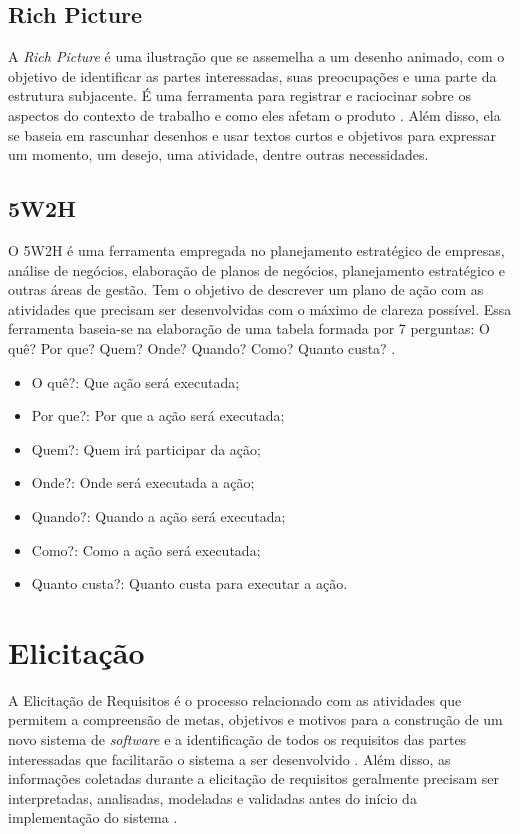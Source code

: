 \subsection{Rich Picture}
A \textit{Rich Picture} é uma ilustração que se assemelha a um desenho animado, com o objetivo de identificar as partes interessadas, suas preocupações e uma parte da estrutura subjacente. É uma ferramenta para registrar e raciocinar sobre os aspectos do contexto de trabalho e como eles afetam o produto  \cite{10.1145/274430.274434}. Além disso, ela se baseia em rascunhar desenhos e usar textos curtos e objetivos para expressar um momento, um desejo, uma atividade, dentre outras necessidades.

\subsection{5W2H}
O 5W2H é uma ferramenta empregada no planejamento estratégico de empresas, análise de negócios, elaboração de planos de negócios, planejamento estratégico e outras áreas de gestão. Tem o objetivo de descrever um plano de ação com as atividades que precisam ser desenvolvidas com o máximo de clareza possível. Essa ferramenta baseia-se na elaboração de uma tabela formada por 7 perguntas: O quê? Por que? Quem? Onde? Quando? Como? Quanto custa? \cite{rabuskeuso}.


\begin{itemize}
    \item O quê?: Que ação será executada;
    \item Por que?: Por que a ação será executada;
    \item Quem?: Quem irá participar da ação;
    \item Onde?: Onde será executada a ação;
    \item Quando?: Quando a ação será executada;
    \item Como?: Como a ação será executada;
    \item Quanto custa?: Quanto custa para executar a ação.
\end{itemize}

\section {Elicitação}

\label{sec:elicitacao}

A Elicitação de Requisitos é o processo relacionado com as atividades que permitem a compreensão de metas, objetivos e motivos para a construção de um novo sistema de \textit{software} e a identificação de todos os requisitos das partes interessadas que facilitarão o sistema a ser desenvolvido \cite{elliott2012software}. Além disso, as informações coletadas durante a elicitação de requisitos geralmente precisam ser interpretadas, analisadas, modeladas e validadas antes do início da implementação do sistema \cite{nuseibeh2000requirements}.

